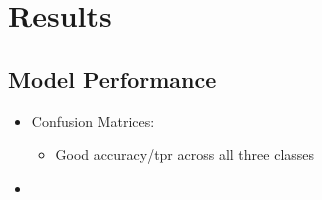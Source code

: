 \documentclass{article}
\begin{document}
\section{Results} \label{sec:results}

\subsection{Model Performance}

\begin{itemize}
    \item Confusion Matrices:
    \begin{itemize}
        \item Good accuracy/tpr across all three classes
    \end{itemize}
    \item 
\end{itemize}
\end{document}
